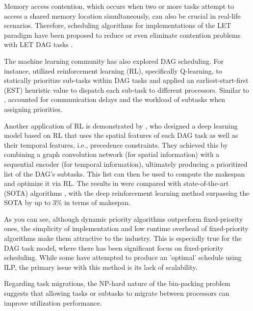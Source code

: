 Memory access contention, which occurs when two or more tasks 
attempt to access a shared memory location simultaneously, can 
also be crucial in real-life scenarios. Therefore, scheduling 
algorithms for implementations of the LET paradigm have been 
proposed to reduce or even eliminate contention problems with LET 
DAG tasks \cite{Yano2021ContentionFree}\cite{Igarashi2020HeuristicContFree}.
\newline


The machine learning community has also explored DAG scheduling. 
For instance, \cite{yano2021work} utilized reinforcement 
learning (RL), specifically Q-learning, to statically prioritize 
sub-tasks within DAG tasks and applied an 
earliest-start-first (EST) heuristic value to dispatch each 
sub-task to different processors. Similar to \cite{ChenDAGorder2023}, 
\cite{yano2021work} accounted for communication delays and the 
workload of subtasks when assigning priorities.

Another application of RL is demonstrated by 
\cite{lee2021DAGDeeplearning}, who designed a deep learning model 
based on RL that uses the spatial features of each DAG task as well 
as their temporal features, i.e., precedence constraints. They 
achieved this by combining a graph convolution network 
(for spatial information) with a sequential encoder 
(for temporal information), ultimately producing a prioritized list 
of the DAG's subtasks. This list can then be used to compute 
the makespan and optimize it via RL. The results in 
\cite{lee2021DAGDeeplearning} were compared with state-of-the-art (SOTA) 
algorithms \cite{he2019intra}\cite{zhao2020dag}, with the deep 
reinforcement learning method surpassing the SOTA by up to 3\% 
in terms of makespan.



As you can see, although dynamic priority algorithms outperform 
fixed-priority ones, the simplicity of implementation and low runtime 
overhead of fixed-priority algorithms make them attractive to the 
industry. This is especially true for the DAG task model, where 
there has been significant focus on fixed-priority scheduling. While 
some have attempted to produce an 'optimal' schedule using 
ILP\cite{wei2011reliabilityILP}\cite{yip2014relaxing}\cite{ChangMinWRCTBoundILP2022}, 
the primary issue with this method is its lack of scalability.

Regarding task migrations, the NP-hard nature of the 
bin-packing problem suggests that allowing tasks or subtasks to migrate 
between processors can improve utilization performance.


